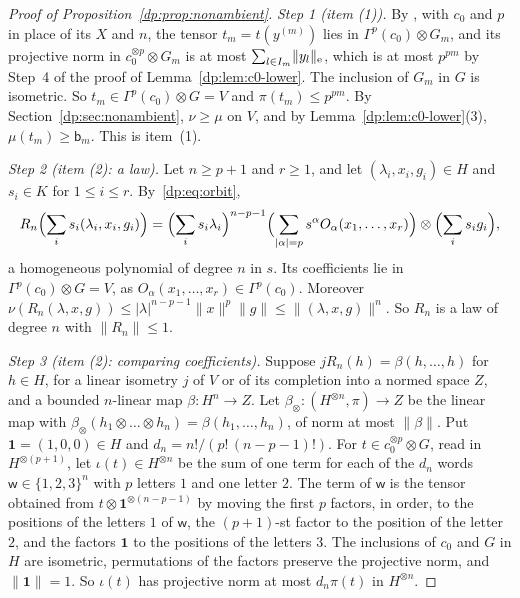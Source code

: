 \documentclass[11pt]{amsart}
\theoremstyle{definition}
\theoremstyle{remark}
\numberwithin{equation}{section}
\newcommand{\abs}[1]{\lvert #1\rvert}
\newcommand{\norm}[1]{\lVert #1\rVert}
\theoremstyle{plain}
\theoremstyle{definition}
\theoremstyle{plain}
\begin{document}
\begin{proof}[Proof of Proposition~\ref{dp:prop:nonambient}]
\emph{Step 1 (item (1)).} By \cite[Lemma~Q.7(1)]{I}, with $c_0$ and $p$ in place of its $X$ and $n$, the tensor $t_m=t(y^{(m)})$ lies in $\Gamma^p(c_0)\otimes G_m$, and its projective norm in $c_0^{\otimes p}\otimes G_m$ is at most $\sum_{l\in I_m}\norm{y_l}_{\rm e}$, which is at most $p^{pm}$ by Step~4 of the proof of Lemma~\ref{dp:lem:c0-lower}. The inclusion of $G_m$ in $G$ is isometric. So $t_m\in\Gamma^p(c_0)\otimes G=V$ and $\pi(t_m)\le p^{pm}$. By Section~\ref{dp:sec:nonambient}, $\nu\ge\mu$ on $V$, and by Lemma~\ref{dp:lem:c0-lower}(3), $\mu(t_m)\ge\mathsf b_m$. This is item~(1).

\emph{Step 2 (item (2): a law).} Let $n\ge p+1$ and $r\ge1$, and let $(\lambda_i,x_i,g_i)\in H$ and $s_i\in K$ for $1\le i\le r$. By~\eqref{dp:eq:orbit},
\[
 R_n\Bigl(\sum_is_i(\lambda_i,x_i,g_i)\Bigr)=\Bigl(\sum_is_i\lambda_i\Bigr)^{n-p-1}\Bigl(\sum_{\abs\alpha=p}s^\alpha O_\alpha(x_1,\dots,x_r)\Bigr)\otimes\Bigl(\sum_is_ig_i\Bigr),
\]
a homogeneous polynomial of degree $n$ in $s$. Its coefficients lie in $\Gamma^p(c_0)\otimes G=V$, as $O_\alpha(x_1,\dots,x_r)\in\Gamma^p(c_0)$. Moreover $\nu(R_n(\lambda,x,g))\le\abs\lambda^{n-p-1}\norm x^p\norm g\le\norm{(\lambda,x,g)}^n$. So $R_n$ is a law of degree $n$ with $\norm{R_n}\le1$.

\emph{Step 3 (item (2): comparing coefficients).} Suppose $jR_n(h)=\beta(h,\dots,h)$ for $h\in H$, for a linear isometry $j$ of $V$ or of its completion into a normed space $Z$, and a bounded $n$\nobreakdash-linear map $\beta\colon H^n\to Z$. Let $\beta_\otimes\colon(H^{\otimes n},\pi)\to Z$ be the linear map with $\beta_\otimes(h_1\otimes\dots\otimes h_n)=\beta(h_1,\dots,h_n)$, of norm at most $\norm\beta$. Put $\mathbf 1=(1,0,0)\in H$ and $d_n=n!/(p!\,(n-p-1)!)$. For $t\in c_0^{\otimes p}\otimes G$, read in $H^{\otimes(p+1)}$, let $\iota(t)\in H^{\otimes n}$ be the sum of one term for each of the $d_n$ words $\mathsf w\in\{1,2,3\}^n$ with $p$ letters $1$ and one letter $2$. The term of $\mathsf w$ is the tensor obtained from $t\otimes\mathbf 1^{\otimes(n-p-1)}$ by moving the first $p$ factors, in order, to the positions of the letters $1$ of $\mathsf w$, the $(p+1)$-st factor to the position of the letter $2$, and the factors $\mathbf 1$ to the positions of the letters $3$. The inclusions of $c_0$ and $G$ in $H$ are isometric, permutations of the factors preserve the projective norm, and $\norm{\mathbf 1}=1$. So $\iota(t)$ has projective norm at most $d_n\pi(t)$ in $H^{\otimes n}$.


\end{proof}
\end{document}
